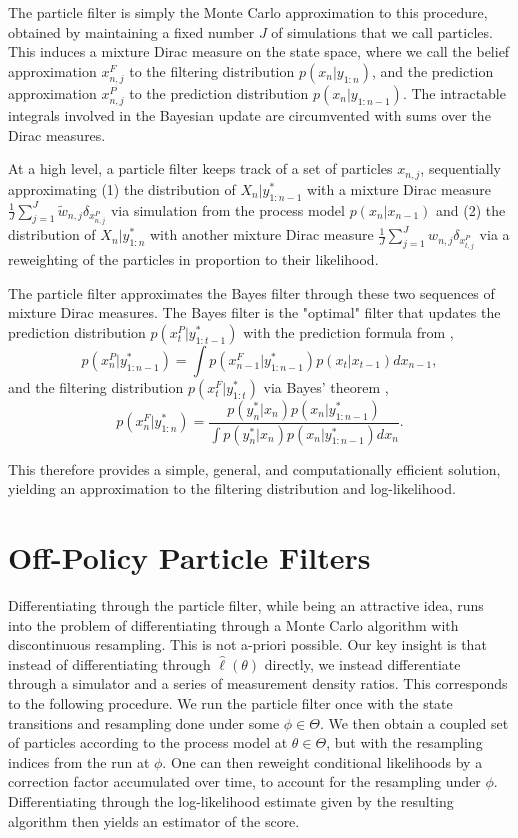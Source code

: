 \documentclass{article}
\begin{document}
The particle filter is simply the Monte Carlo approximation to this procedure, obtained by maintaining a fixed number $J$ of simulations that we call particles. This induces a mixture Dirac measure on the state space, where we call the belief approximation $x_{n,j}^F$ to the filtering distribution $p(x_n|y_{1:n})$, and the prediction approximation $x_{n,j}^P$ to the prediction distribution $p(x_{n}|y_{1:n-1})$. The intractable integrals involved in the Bayesian update are circumvented with sums over the Dirac measures. 

At a high level, a particle filter keeps track of a set of particles $x_{n,j}$, sequentially approximating (1) the distribution of $X_{n}|y_{1:n-1}^*$ with a mixture Dirac measure $\frac{1}{J}\sum_{j=1}^J \tilde{w}_{n,j}\delta_{x_{n,j}^P}$ via simulation from the process model $p(x_n|x_{n-1})$ and (2) the distribution of $X_{n}|y_{1:n}^*$ with another mixture Dirac measure $\frac{1}{J}\sum_{j=1}^J w_{n,j}\delta_{x_{t,j}^P}$ via a reweighting of the particles in proportion to their likelihood. 

The particle filter approximates the Bayes filter through these two sequences of mixture Dirac measures. The Bayes filter is the "optimal" filter that updates the prediction distribution $p(x_{t}^P|y_{1:t-1}^*)$ with the prediction formula from \cite{sbied_lec3}, 
\begin{equation}
    p(x_{n}^P|y_{1:n-1}^*) = \int p(x_{n-1}^F|y_{1:n-1}^*)p(x_t|x_{t-1}) dx_{n-1},
\end{equation}
and the filtering distribution $p(x_t^F|y_{1:t}^*)$ via Bayes' theorem \citep{sbied_lec3},
\begin{equation}
    p(x_n^F|y_{1:n}^*) = \frac{p(y_n^*|x_n)p(x_n|y_{1:n-1}^*)}{\int p(y_n^*|x_n)p(x_n|y_{1:n-1}^*) dx_n}.
\end{equation}

This therefore provides a simple, general, and computationally efficient solution, yielding an approximation to the filtering distribution and log-likelihood. 

\section{Off-Policy Particle Filters}

Differentiating through the particle filter, while being an attractive idea, runs into the problem of differentiating through a Monte Carlo algorithm with discontinuous resampling. This is not a-priori possible. Our key insight is that instead of differentiating through $\hat\ell(\theta)$ directly, we instead differentiate through a simulator and a series of measurement density ratios. This corresponds to the following procedure. We run the particle filter once with the state transitions and resampling done under some $\phi \in \Theta$. We then obtain a coupled set of particles according to the process model at $\theta \in \Theta$, but with the resampling indices from the run at $\phi$. One can then reweight conditional likelihoods by a correction factor accumulated over time, to account for the resampling under $\phi$. Differentiating through the log-likelihood estimate given by the resulting algorithm then yields an estimator of the score. 
\end{document}
